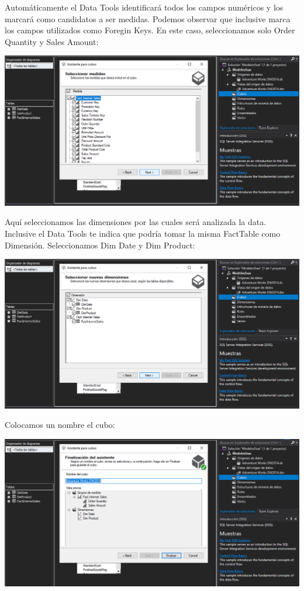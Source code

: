 Automáticamente el Data Tools identificará todos los campos numéricos y los marcará como candidatos a ser medidas. Podemos observar que inclusive marca los campos utilizados como Foregin Keys. En este caso, seleccionamos solo Order Quantity y Sales Amount:
	\begin{center}
	\includegraphics[width=\columnwidth]{images/task1/15}
    \end{center}	
    
Aquí seleccionamos las dimensiones por las cuales será analizada la data. Inclusive el Data Tools te indica que podría tomar la misma FactTable como Dimensión. Seleccionamos Dim Date y Dim Product:
	\begin{center}
	\includegraphics[width=\columnwidth]{images/task1/16}
	\end{center}	

Colocamos un nombre el cubo:
	\begin{center}
	\includegraphics[width=\columnwidth]{images/task1/17}
	\end{center}	
	

